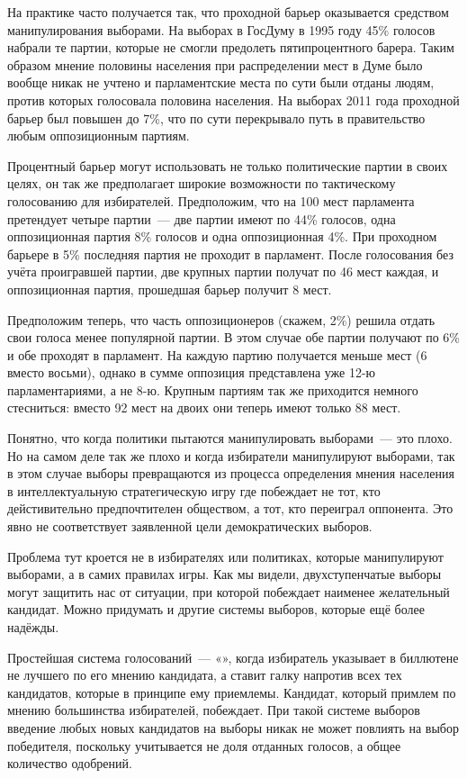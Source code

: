На практике часто получается так, что проходной барьер оказывается средством манипулирования выборами. На выборах в ГосДуму в 1995 году 45\% голосов набрали те партии, которые не смогли предолеть пятипроцентного барера. Таким образом мнение половины населения при распределении мест в Думе было вообще никак не учтено и парламентские места по сути были отданы людям, против которых голосовала половина населения. На выборах 2011 года проходной барьер был повышен до 7\%, что по сути перекрывало путь в правительство любым оппозиционным партиям.

Процентный барьер могут использовать не только политические партии в своих целях, он так же предполагает широкие возможности по тактическому голосованию для избирателей. Предположим, что на 100 мест парламента претендует четыре партии~— две партии имеют по 44\% голосов, одна оппозиционная партия 8\% голосов и одна оппозиционная 4\%. При проходном барьере в 5\% последняя партия не проходит в парламент. После голосования без учёта проигравшей партии, две крупных партии получат по 46 мест каждая, и оппозиционная партия, прошедшая барьер получит 8 мест.

Предположим теперь, что часть оппозиционеров (скажем, 2\%) решила отдать свои голоса менее популярной партии. В этом случае обе партии получают по 6\% и обе проходят в парламент. На каждую партию получается меньше мест (6 вместо восьми), однако в сумме оппозиция представлена уже 12-ю парламентариями, а не 8-ю. Крупным партиям так же приходится немного стесниться: вместо 92 мест на двоих они теперь имеют только 88 мест.

Понятно, что когда политики пытаются манипулировать выборами~— это плохо. Но на самом деле так же плохо и когда избиратели манипулируют выборами, так в этом случае выборы превращаются из процесса определения мнения населения в интеллектуальную стратегическую игру где побеждает не тот, кто дейстивительно предпочтителен обществом, а тот, кто переиграл оппонента. Это явно не соответствует заявленной цели демократических выборов.

Проблема тут кроется не в избирателях или политиках, которые манипулируют выборами, а в самих правилах игры. Как мы видели, двухступенчатые выборы могут защитить нас от ситуации, при которой побеждает наименее желательный кандидат. Можно придумать и другие системы выборов, которые ещё более надёжды.

Простейшая система голосований~— «», когда избиратель указывает в биллютене не лучшего по его мнению кандидата, а ставит галку напротив всех тех кандидатов, которые в принципе ему приемлемы. Кандидат, который примлем по мнению большинства избирателей, побеждает. При такой системе выборов введение любых новых кандидатов на выборы никак не может повлиять на выбор победителя, поскольку учитывается не доля отданных голосов, а общее количество одобрений.

